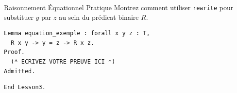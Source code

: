 \documentclass[11pt,a4paper]{article}
\begin{document}
\begin{exercice}{Raisonnement Équationnel Pratique}{}
  Montrez comment utiliser \texttt{rewrite} pour substituer $y$ par $z$ au sein du prédicat binaire $R$.

\begin{lstlisting}
Lemma equation_exemple : forall x y z : T,
  R x y -> y = z -> R x z.
Proof.
  (* ECRIVEZ VOTRE PREUVE ICI *)
Admitted.
\end{lstlisting}
\end{exercice}

\begin{lstlisting}
End Lesson3.
\end{lstlisting}
\end{document}
